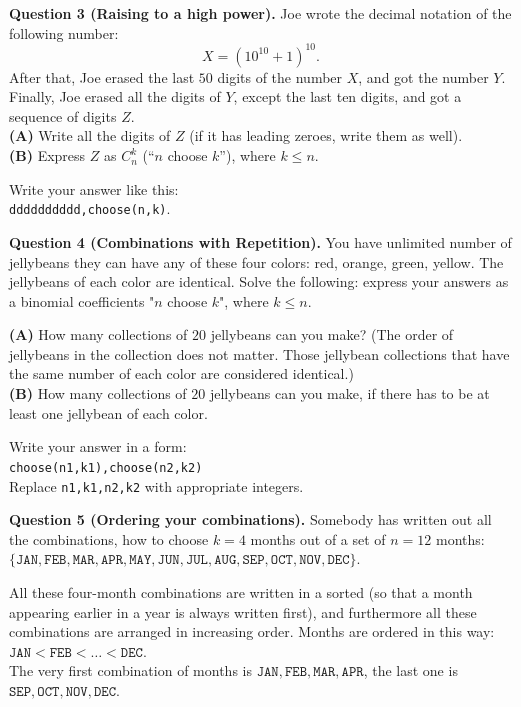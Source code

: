 \documentclass[jou]{apa6}
\begin{document}
\vspace{6pt}
{\bf Question 3 (Raising to a high power).} 
Joe wrote the decimal notation of the following number:
$$X = \left( 10^{10} + 1 \right)^{10}.$$
After that, Joe erased the last $50$ digits of the number $X$, and got the number $Y$. 
Finally, Joe erased all the digits of $Y$, except the last ten digits, and got a sequence of digits $Z$.\\
{\bf (A)} Write all the digits of $Z$ (if it has leading zeroes, write them as well).\\
{\bf (B)} Express $Z$ as $C_n^k$ (``$n$ choose $k$''), where $k \leq n$.

Write your answer like this:\\ {\tt dddddddddd,choose(n,k)}.


\vspace{6pt}
{\bf Question 4 (Combinations with Repetition).} You have unlimited number of jellybeans \textendash{}
they can have any of these four colors: red, orange, green, yellow. The jellybeans of each
color are identical. Solve the following: express your answers as a binomial coefficients "$n$ choose $k$", 
where $k \leq n$.

{\bf (A)}  How many collections of $20$ jellybeans can you make? (The order of jellybeans in the collection 
does not matter. Those jellybean collections that have the same number of each color are considered identical.)\\
{\bf (B)} How many collections of $20$ jellybeans can you make, if there has to be at least one jellybean 
of each color. 

Write your answer in a form:\\ {\tt choose(n1,k1),choose(n2,k2)}\\
Replace {\tt n1,k1,n2,k2} with appropriate integers.


\vspace{6pt}
{\bf Question 5 (Ordering your combinations).} 
Somebody has written out all the combinations, how to choose $k=4$ months out of a set of 
$n=12$ months:\\
{\small
$\{ \mathtt{JAN},\mathtt{FEB},\mathtt{MAR},\mathtt{APR},\mathtt{MAY},\mathtt{JUN},
\mathtt{JUL},\mathtt{AUG},\mathtt{SEP},\mathtt{OCT},\mathtt{NOV},\mathtt{DEC} \}.$
}

All these four-month combinations are written in a sorted (so that a month appearing earlier in a year is always
written first), and furthermore \textendash{} all these combinations are arranged in increasing order. 
Months are ordered in this way: $\mathtt{JAN} < \mathtt{FEB} < \ldots < \mathtt{DEC}$.\\
The very first combination of months is $\mathtt{JAN},\mathtt{FEB},\mathtt{MAR},\mathtt{APR}$, 
the last one is $\mathtt{SEP},\mathtt{OCT},\mathtt{NOV},\mathtt{DEC}$. 
\end{document}
